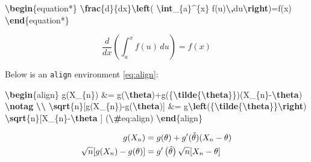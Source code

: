 \documentclass[
  12pt,
]{krantz}
\newenvironment{Shaded}{\begin{snugshade}}{\end{snugshade}}
\newcommand{\ExtensionTok}[1]{#1}
\newcommand{\KeywordTok}[1]{\textcolor[rgb]{0.13,0.29,0.53}{\textbf{#1}}}
\newcommand{\NormalTok}[1]{#1}
\newcommand{\SpecialCharTok}[1]{\textcolor[rgb]{0.81,0.36,0.00}{\textbf{#1}}}
\newcommand{\SpecialStringTok}[1]{\textcolor[rgb]{0.31,0.60,0.02}{#1}}
\theoremstyle{definition}
\theoremstyle{definition}
\theoremstyle{definition}
\theoremstyle{definition}
\theoremstyle{remark}
\begin{document}
\begin{Shaded}
\begin{Highlighting}[]
\KeywordTok{\textbackslash{}begin}\NormalTok{\{}\ExtensionTok{equation*}\NormalTok{\}}\SpecialStringTok{ }
\SpecialCharTok{\textbackslash{}frac}\SpecialStringTok{\{d\}\{dx\}}\SpecialCharTok{\textbackslash{}left}\SpecialStringTok{( }\SpecialCharTok{\textbackslash{}int}\SpecialStringTok{\_\{a\}\^{}\{x\} f(u)}\SpecialCharTok{\textbackslash{},}\SpecialStringTok{du}\SpecialCharTok{\textbackslash{}right}\SpecialStringTok{)=f(x)}
\KeywordTok{\textbackslash{}end}\NormalTok{\{}\ExtensionTok{equation*}\NormalTok{\} }
\end{Highlighting}
\end{Shaded}

\begin{equation*}
\frac{d}{dx}\left( \int_{a}^{x} f(u)\,du\right)=f(x)
\end{equation*}

Below is an \texttt{align} environment \eqref{eq:align}:

\begin{Shaded}
\begin{Highlighting}[]
\KeywordTok{\textbackslash{}begin}\NormalTok{\{}\ExtensionTok{align}\NormalTok{\}}\SpecialStringTok{ }
\SpecialStringTok{g(X\_\{n\}) \&= g(}\SpecialCharTok{\textbackslash{}theta}\SpecialStringTok{)+g\textquotesingle{}(\{}\SpecialCharTok{\textbackslash{}tilde}\SpecialStringTok{\{}\SpecialCharTok{\textbackslash{}theta}\SpecialStringTok{\}\})(X\_\{n\}{-}}\SpecialCharTok{\textbackslash{}theta}\SpecialStringTok{) }\SpecialCharTok{\textbackslash{}notag}\SpecialStringTok{ }\SpecialCharTok{\textbackslash{}\textbackslash{}}
\SpecialCharTok{\textbackslash{}sqrt}\SpecialStringTok{\{n\}[g(X\_\{n\}){-}g(}\SpecialCharTok{\textbackslash{}theta}\SpecialStringTok{)] \&= g\textquotesingle{}}\SpecialCharTok{\textbackslash{}left}\SpecialStringTok{(\{}\SpecialCharTok{\textbackslash{}tilde}\SpecialStringTok{\{}\SpecialCharTok{\textbackslash{}theta}\SpecialStringTok{\}\}}\SpecialCharTok{\textbackslash{}right}\SpecialStringTok{)}
\SpecialStringTok{  }\SpecialCharTok{\textbackslash{}sqrt}\SpecialStringTok{\{n\}[X\_\{n\}{-}}\SpecialCharTok{\textbackslash{}theta}\SpecialStringTok{ ] (}\SpecialCharTok{\textbackslash{}\#}\SpecialStringTok{eq:align)}
\KeywordTok{\textbackslash{}end}\NormalTok{\{}\ExtensionTok{align}\NormalTok{\} }
\end{Highlighting}
\end{Shaded}

\begin{align}
g(X_{n}) &= g(\theta)+g'({\tilde{\theta}})(X_{n}-\theta) \notag \\
\sqrt{n}[g(X_{n})-g(\theta)] &= g'\left({\tilde{\theta}}\right)
  \sqrt{n}[X_{n}-\theta ] \label{eq:align}
\end{align}
\end{document}
